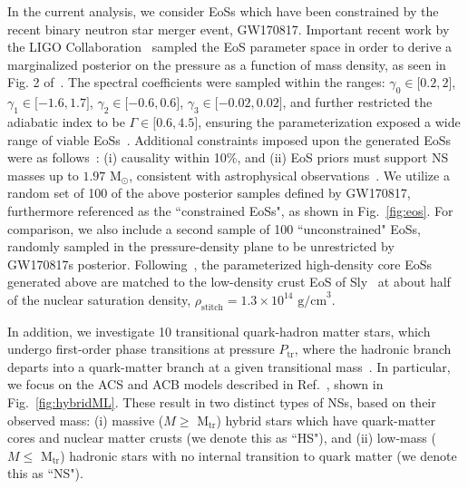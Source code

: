 \documentclass[prd,twocolumn,nofootinbib,superscriptaddress,amsmath,amssymb]{revtex4-1}
\begin{document}
In the current analysis, we consider EoSs which have been constrained by the recent binary neutron star merger event, GW170817.
Important recent work by the LIGO Collaboration~\cite{LIGO:posterior,Carney:2018sdv} sampled the EoS parameter space in order to derive a marginalized posterior on the pressure as a function of mass density, as seen in Fig. 2 of~\cite{LIGO:posterior}.
The spectral coefficients were sampled within the ranges: $\gamma_0 \in \lbrack 0.2,2 \rbrack$, $\gamma_1 \in \lbrack -1.6,1.7 \rbrack$, $\gamma_2 \in \lbrack -0.6,0.6 \rbrack$, $\gamma_3 \in \lbrack -0.02,0.02 \rbrack$, and further restricted the adiabatic index to be $\Gamma \in \lbrack 0.6,4.5 \rbrack$, ensuring the parameterization exposed a wide range of viable EoSs~\cite{Lindblom:parameters}.
Additional constraints imposed upon the generated EoSs were as follows~\cite{LIGO:posterior}: (i) causality within 10\%, and (ii) EoS priors must support NS masses up to $1.97 \text{ M}_{\odot}$, consistent with astrophysical observations~\cite{Zhao:massiveNS}.
We utilize a random set of 100 of the above posterior samples defined by GW170817, furthermore referenced as the ``constrained EoSs", as shown in Fig.~\ref{fig:eos}.
For comparison, we also include a second sample of 100 ``unconstrained" EoSs, randomly sampled in the pressure-density plane to be unrestricted by GW170817s posterior.
Following~\cite{Read2009}, the parameterized high-density core EoSs generated above are matched to the low-density crust EoS of Sly~\cite{Douchin:2001sv} at about half of the nuclear saturation density, $\rho_{\text{stitch}}=1.3 \times 10^{14} \text{ g/cm}^3$.

In addition, we investigate 10 transitional quark-hadron matter stars, which undergo first-order phase transitions at pressure $P_{\text{tr}}$, where the hadronic branch departs into a quark-matter branch at a given transitional mass~\cite{Paschalidis2018,Alford:2017qgh,1971SvA....15..347S,Zdunik:2012dj,Alford:2013aca}.
In particular, we focus on the ACS and ACB models described in Ref.~\cite{Paschalidis2018}, shown in Fig.~\ref{fig:hybridML}.
These result in two distinct types of NSs, based on their observed mass: (i) massive ($M \geq \text{ M}_{\text{tr}}$) hybrid stars which have quark-matter cores and nuclear matter crusts (we denote this as ``HS"), and (ii) low-mass ($M \leq \text{ M}_{\text{tr}}$) hadronic stars with no internal transition to quark matter (we denote this as ``NS").
\end{document}
